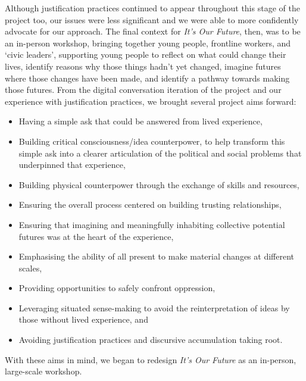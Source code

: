 Although justification practices continued to appear throughout this stage of the project too, our issues were less significant and we were able to more confidently advocate for our approach. The final context for \textit{It's Our Future}, then, was to be an in-person workshop, bringing together young people, frontline workers, and `civic leaders', supporting young people to reflect on what could change their lives, identify reasons why those things hadn't yet changed, imagine futures where those changes have been made, and identify a pathway towards making those futures. From the digital conversation iteration of the project and our experience with justification practices, we brought several project aims forward:
\begin{itemize}
\item Having a simple ask that could be answered from lived experience,
    \item Building critical consciousness/idea counterpower, to help transform this simple ask into a clearer articulation of the political and social problems that underpinned that experience,
    \item Building physical counterpower through the exchange of skills and resources,
    \item Ensuring the overall process centered on building trusting relationships,
    \item Ensuring that imagining and meaningfully inhabiting collective potential futures was at the heart of the experience,
    \item Emphasising the ability of all present to make material changes at different scales,
    \item Providing opportunities to safely confront oppression,
    \item Leveraging situated sense-making to avoid the reinterpretation of ideas by those without lived experience, and
    \item Avoiding justification practices and discursive accumulation taking root. 
\end{itemize}
With these aims in mind, we began to redesign \textit{It's Our Future} as an in-person, large-scale workshop.

